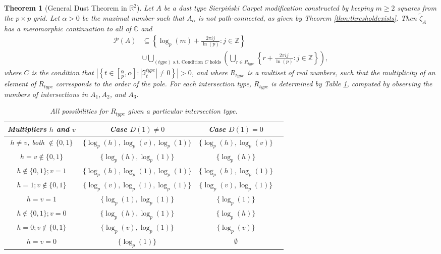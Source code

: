 \documentclass{article}
\theoremstyle{plain}
\newtheorem{theorem}{Theorem}
\numberwithin{equation}{section}
\numberwithin{table}{section}
\numberwithin{figure}{section}
\begin{document}
\begin{theorem}[General Dust Theorem in $\mathbb{R}^2$]\label{thm:gammaconnected2}
Let $A$ be a dust type Sierpi\'nski Carpet modification constructed by keeping $m \geq 2$ squares from the $p \times p$ grid. Let $\alpha > 0$ be the maximal number such that $A_{\alpha}$ is not path-connected, as given by Theorem \ref{thm:thresholdexists}. Then $\tilde{\zeta}_A$ has a meromorphic continuation to all of $\mathbb{C}$ and
\begin{align}
\mathscr{P}(A) &\subseteq \left\{\log_p(m) + \frac{2\pi i j}{\ln(p)} : j \in \mathbb{Z}\right\}\nonumber\\&\cup \bigcup_{(type) \text{ s.t. Condition } C \text{ holds}} \left(\bigcup_{r \in R_{type}} \left\{r + \frac{2\pi i j}{\ln(p)} : j \in \mathbb{Z}\right\}\right),
\end{align}
where $C$ is the condition that $\left|\left\{t \in \left[\frac{\alpha}{p},\alpha\right] : \left|\mathfrak{I}_t^{type}\right| \neq 0\right\}\right| > 0$, and where $R_{type}$ is a multiset of real numbers, such that the multiplicity of an element of $R_{type}$ corresponds to the order of the pole. For each intersection type, $R_{type}$ is determined by Table \ref{table:allthepoles}, computed by observing the numbers of intersections in $A_1, A_2$, and $A_3$.

\begin{table}[!h]
\begin{center}
\begin{tabular}{|c||c|c|c|}
\hline
\textbf{Multipliers $h$ and $v$} & \textbf{Case $D(1) \neq 0$} & \textbf{Case $D(1) = 0$} \\
\hline
\hline
$h \neq v$, both $\notin \{0,1\}$ & $\{\log_p(h), \log_p(v), \log_p(1)\}$ & $\{\log_p(h), \log_p(v)\}$ \\
\hline
$h = v \notin \{0,1\}$ & $\{\log_p(h), \log_p(1)\}$ & $\{\log_p(h)\}$ \\
\hline
$h \notin \{0,1\}; v = 1$ & $\{\log_p(h), \log_p(1), \log_p(1)\}$ & $\{\log_p(h), \log_p(1)\}$ \\
\hline
$h = 1; v \notin \{0,1\}$ & $\{\log_p(v), \log_p(1), \log_p(1)\}$ & $\{\log_p(v), \log_p(1)\}$ \\
\hline
$h = v = 1$ & $\{\log_p(1), \log_p(1)\}$ & $\{\log_p(1)\}$ \\
\hline
$h \notin \{0,1\}; v = 0$ & $\{\log_p(h), \log_p(1)\}$ & $\{\log_p(h)\}$ \\
\hline
$h = 0; v \notin \{0,1\}$ & $\{\log_p(v), \log_p(1)\}$ & $\{\log_p(v)\}$ \\
\hline
$h = v = 0$ & $\{\log_p(1)\}$ & $\emptyset$ \\
\hline
\end{tabular}
\caption{All possibilities for $R_{type}$ given a particular intersection type.}
\label{table:allthepoles}
\end{center}
\end{table}
\end{theorem}
\end{document}
